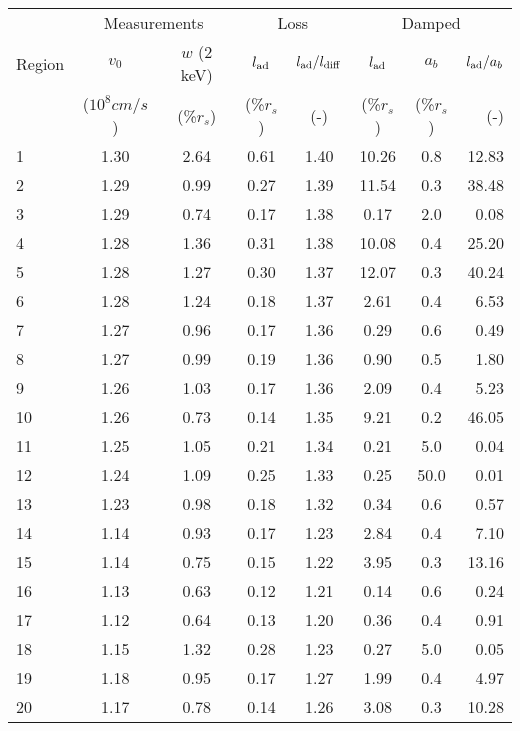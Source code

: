 \begin{tabular}{@{}l cc cc ccr@{}}
\toprule
{} & \multicolumn{2}{c}{Measurements}
   & \multicolumn{2}{c}{Loss}
   & \multicolumn{3}{c}{Damped} \\
\cmidrule(lr){2-3} \cmidrule(lr){4-5} \cmidrule(l){6-8}
Region & $v_0$ & $w$ (2 keV)
       & $l_{\mathrm{ad}}$ & $l_{\mathrm{ad}}/l_{\mathrm{diff}}$
       & $l_{\mathrm{ad}}$ & $a_b$ & $l_{\mathrm{ad}}/a_b$ \\
{} & ($10^8 \unit{cm/s}$) & (\%$r_s$)
   & (\%$r_s$) & (-)
   & (\%$r_s$) & (\%$r_s$) & (-) \\
\midrule
 1 & 1.30 & 2.64 & 0.61 & 1.40 & 10.26 &  0.8 & 12.83 \\
 2 & 1.29 & 0.99 & 0.27 & 1.39 & 11.54 &  0.3 & 38.48 \\
 3 & 1.29 & 0.74 & 0.17 & 1.38 &  0.17 &  2.0 &  0.08 \\
\cmidrule{1-8}
 4 & 1.28 & 1.36 & 0.31 & 1.38 & 10.08 &  0.4 & 25.20 \\
 5 & 1.28 & 1.27 & 0.30 & 1.37 & 12.07 &  0.3 & 40.24 \\
 6 & 1.28 & 1.24 & 0.18 & 1.37 &  2.61 &  0.4 &  6.53 \\
 7 & 1.27 & 0.96 & 0.17 & 1.36 &  0.29 &  0.6 &  0.49 \\
 8 & 1.27 & 0.99 & 0.19 & 1.36 &  0.90 &  0.5 &  1.80 \\
 9 & 1.26 & 1.03 & 0.17 & 1.36 &  2.09 &  0.4 &  5.23 \\
10 & 1.26 & 0.73 & 0.14 & 1.35 &  9.21 &  0.2 & 46.05 \\
\cmidrule{1-8}
11 & 1.25 & 1.05 & 0.21 & 1.34 &  0.21 &  5.0 &  0.04 \\
12 & 1.24 & 1.09 & 0.25 & 1.33 &  0.25 & 50.0 &  0.01 \\
13 & 1.23 & 0.98 & 0.18 & 1.32 &  0.34 &  0.6 &  0.57 \\
\cmidrule{1-8}
14 & 1.14 & 0.93 & 0.17 & 1.23 &  2.84 &  0.4 &  7.10 \\
15 & 1.14 & 0.75 & 0.15 & 1.22 &  3.95 &  0.3 & 13.16 \\
16 & 1.13 & 0.63 & 0.12 & 1.21 &  0.14 &  0.6 &  0.24 \\
17 & 1.12 & 0.64 & 0.13 & 1.20 &  0.36 &  0.4 &  0.91 \\
\cmidrule{1-8}
18 & 1.15 & 1.32 & 0.28 & 1.23 &  0.27 &  5.0 &  0.05 \\
19 & 1.18 & 0.95 & 0.17 & 1.27 &  1.99 &  0.4 &  4.97 \\
20 & 1.17 & 0.78 & 0.14 & 1.26 &  3.08 &  0.3 & 10.28 \\
\bottomrule
\end{tabular}

